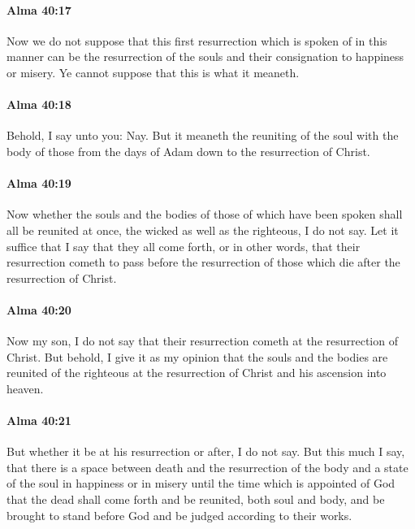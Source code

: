 		\paragraph{Alma 40:17} %
			\label{ALMA-40-17}

			Now we do not suppose
			that this first resurrection which is spoken of in this manner
			can be the resurrection of the souls
			and their consignation to happiness or misery.
			Ye cannot suppose that this is what it meaneth.

		\paragraph{Alma 40:18} %
			\label{ALMA-40-18}

			Behold, I say unto you: Nay.
			But it meaneth the reuniting of the soul with the body
			of those from the days of Adam down to the resurrection of Christ.

		\paragraph{Alma 40:19} %
			\label{ALMA-40-19}

			Now whether the souls and the bodies of those of which have been spoken
			shall all be reunited at once,
			the wicked as well as the righteous,
			I do not say.
			Let it suffice that I say that they all come forth,
			or in other words, that their resurrection cometh to pass
			before the resurrection of those which die after the resurrection of Christ.

		\paragraph{Alma 40:20} %
			\label{ALMA-40-20}

			Now my son, I do not say
			that their resurrection cometh at the resurrection of Christ.
			But behold, I give it as my opinion
			that the souls and the bodies are reunited of the righteous
			at the resurrection of Christ and his ascension into heaven.

		\paragraph{Alma 40:21} %
			\label{ALMA-40-21}

			But whether it be at his resurrection or after, I do not say.
			But this much I say,
			that there is a space between death and the resurrection of the body
			and a state of the soul in happiness or in misery
			until the time which is appointed of God
			that the dead shall come forth and be reunited, both soul and body,
			and be brought to stand before God
			and be judged according to their works.

